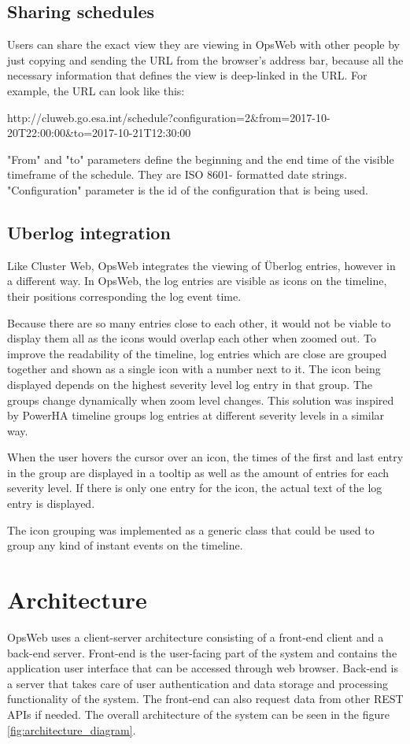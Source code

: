 \subsection{Sharing schedules}
Users can share the exact view they are viewing in OpsWeb with other people by just copying and sending the URL from the browser's address bar, because all the necessary information that defines the view is deep-linked in the URL. For example, the URL can look like this:

http://cluweb.go.esa.int/schedule?configuration=2\&from=2017-10-20T22:00:00\&to=2017-10-21T12:30:00

"From" and "to" parameters define the beginning and the end time of the visible timeframe of the schedule. They are ISO 8601- formatted date strings. "Configuration" parameter is the id of the configuration that is being used.

\subsection{Uberlog integration}
Like Cluster Web, OpsWeb integrates the viewing of Überlog entries, however in a different way. In OpsWeb, the log entries are visible as icons on the timeline, their positions corresponding the log event time. 

Because there are so many entries close to each other, it would not be viable to display them all as the icons would overlap each other when zoomed out. To improve the readability of the timeline, log entries which are close are grouped together and shown as a single icon with a number next to it. The icon being displayed depends on the highest severity level log entry in that group. The groups change dynamically when zoom level changes. This solution was inspired by PowerHA timeline groups log entries at different severity levels in a similar way. \cite{ibm_timeline}

When the user hovers the cursor over an icon, the times of the first and last entry in the group are displayed in a tooltip as well as the amount of entries for each severity level. If there is only one entry for the icon, the actual text of the log entry is displayed.

The icon grouping was implemented as a generic class that could be used to group any kind of instant events on the timeline.
\section{Architecture}
OpsWeb uses a client-server architecture consisting of a front-end client and a back-end server. Front-end is the user-facing part of the system and contains the application user interface that can be accessed through web browser. Back-end is a server that takes care of user authentication and data storage and processing functionality of the system. The front-end can also request data from other REST APIs if needed. The overall architecture of the system can be seen in the figure \ref{fig:architecture_diagram}.

